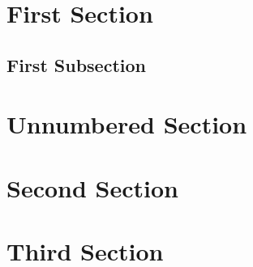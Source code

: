 \documentclass[12pt,a4paper]{article}
\begin{document}
\doublespacing
\tableofcontents
\singlespacing

\section{First Section}

\subsection{First Subsection}

\blindtext


\section*{Unnumbered Section}

\section{Second Section}

\pagebreak

\section{Third Section}
\end{document}
